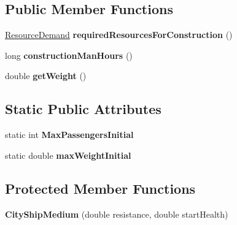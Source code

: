 \subsection*{Public Member Functions}
\begin{DoxyCompactItemize}
\item 
\hyperlink{classuniverse_1_1_resource_demand}{Resource\+Demand} {\bfseries required\+Resources\+For\+Construction} ()\hypertarget{classtools_1_1vehicles_1_1space_1_1_city_ship_medium_aa726c690ebcb9852f60554a4ec02ef3b}{}\label{classtools_1_1vehicles_1_1space_1_1_city_ship_medium_aa726c690ebcb9852f60554a4ec02ef3b}

\item 
long {\bfseries construction\+Man\+Hours} ()\hypertarget{classtools_1_1vehicles_1_1space_1_1_city_ship_medium_a0af736ddcb0f16add608947b7ae13f3c}{}\label{classtools_1_1vehicles_1_1space_1_1_city_ship_medium_a0af736ddcb0f16add608947b7ae13f3c}

\item 
double {\bfseries get\+Weight} ()\hypertarget{classtools_1_1vehicles_1_1space_1_1_city_ship_medium_a8bfd7be33cb3ac04ac7a3ee37af879c1}{}\label{classtools_1_1vehicles_1_1space_1_1_city_ship_medium_a8bfd7be33cb3ac04ac7a3ee37af879c1}

\end{DoxyCompactItemize}
\subsection*{Static Public Attributes}
\begin{DoxyCompactItemize}
\item 
static int {\bfseries Max\+Passengers\+Initial}\hypertarget{classtools_1_1vehicles_1_1space_1_1_city_ship_medium_aeb004ea5eaf33c18fdd3fdd277c197b9}{}\label{classtools_1_1vehicles_1_1space_1_1_city_ship_medium_aeb004ea5eaf33c18fdd3fdd277c197b9}

\item 
static double {\bfseries max\+Weight\+Initial}\hypertarget{classtools_1_1vehicles_1_1space_1_1_city_ship_medium_a53db5a634ceed01f4afa7d1ca6f0db39}{}\label{classtools_1_1vehicles_1_1space_1_1_city_ship_medium_a53db5a634ceed01f4afa7d1ca6f0db39}

\end{DoxyCompactItemize}
\subsection*{Protected Member Functions}
\begin{DoxyCompactItemize}
\item 
{\bfseries City\+Ship\+Medium} (double resistance, double start\+Health)\hypertarget{classtools_1_1vehicles_1_1space_1_1_city_ship_medium_a9850e85d4b77f498453bc966818821af}{}\label{classtools_1_1vehicles_1_1space_1_1_city_ship_medium_a9850e85d4b77f498453bc966818821af}

\end{DoxyCompactItemize}
